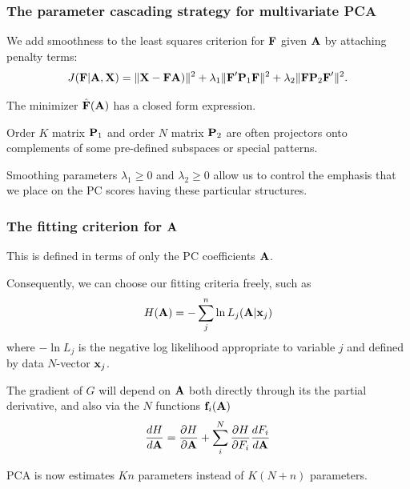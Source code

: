 \documentclass[11pt]{beamer}
\begin{document}
\begin{frame}

\frametitle{The parameter cascading strategy for multivariate PCA}

\bi
  \item We add smoothness to the least squares criterion for $\mbox{\bf F}$ given $\mbox{\bf A}$ by attaching penalty terms:
  \[
    J(\mbox{\bf F}|\mbox{\bf A},\mbox{\bf X}) = \| \mbox{\bf X} - \mbox{\bf F} \mbox{\bf A}) \|^2 +
              \lambda_1 \| \mbox{\bf F}' \mbox{\bf P}_1 \mbox{\bf F} \|^2 + \lambda_2 \| \mbox{\bf F}  \mbox{\bf P}_2 \mbox{\bf F}' \|^2.
  \]
  \item The minimizer $\hat{\mbox{\bf F}}(\mbox{\bf A})$ has a closed form expression.
  \item Order $K$ matrix $\mbox{\bf P}_1$ and order $N$ matrix $\mbox{\bf P}_2$ are often projectors onto complements of some pre-defined subspaces or special patterns.
  \item Smoothing parameters $\lambda_1 \geq 0$ and $\lambda_2 \geq 0$ allow us to control the emphasis that we place on the PC scores having these particular structures.
\ei

\end{frame}


\begin{frame}

\frametitle{The fitting criterion for $\mbox{\bf A}$}

\bi
  \item This is defined in terms of only the PC coefficients $\mbox{\bf A}$.
  \item Consequently, we can choose our fitting criteria freely, such as
    \[
      H(\mbox{\bf A}) = -\sum_j^n \ln L_j(\mbox{\bf A}|\mbox{\bf x}_j)
    \]
  where $-\ln L_j$ is the negative log likelihood appropriate to variable $j$ and defined by data $N$-vector $\mbox{\bf x}_j$.
  \item The gradient of $G$ will depend on $\mbox{\bf A}$ both directly through its the partial derivative, and also via the $N$ functions $\mbox{\bf f}_i(\mbox{\bf A})$
    \[
        \frac{dH}{d \mbox{\bf A}} = \frac{\partial H}{\partial \mbox{\bf A}} + 
        \sum_i^N \frac{\partial H}{\partial F_i} \frac{dF_i}{d \mbox{\bf A}}
    \]
  \item PCA is now estimates $Kn$ parameters instead of $K(N+n)$ parameters.
\ei

\end{frame}

\end{document}
